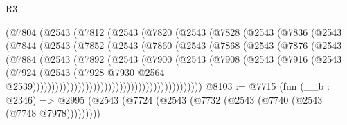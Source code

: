 \begin{lexlean}{R3}
\begin{coremodule}
                            (@7804
                              (@2543
                                (@7812
                                  (@2543
                                    (@7820
                                      (@2543
                                        (@7828
                                          (@2543
                                            (@7836
                                              (@2543
                                                (@7844
                                                  (@2543
                                                    (@7852
                                                      (@2543
                                                        (@7860
                                                          (@2543
                                                            (@7868
                                                              (@2543
                                                                (@7876
                                                                  (@2543
                                                                    (@7884
                                                                      (@2543
                                                                        (@7892
                                                                          (@2543
                                                                            (@7900
                                                                              (@2543
                                                                                (@7908
                                                                                  (@2543
                                                                                    (@7916
                                                                                      (@2543
                                                                                        (@7924
                                                                                          (@2543
                                                                                            (@7928
                                                                                              @7930
                                                                                              @2564
                                                                                              @2539)))))))))))))))))))))))))))))))))))))))))))))
@8103 := @7715
    (fun (__b : @2346) =>
    @2995 (@2543 (@7724 (@2543 (@7732 (@2543 (@7740 (@2543 (@7748 @7978)))))))))

\end{coremodule}
\end{lexlean}
